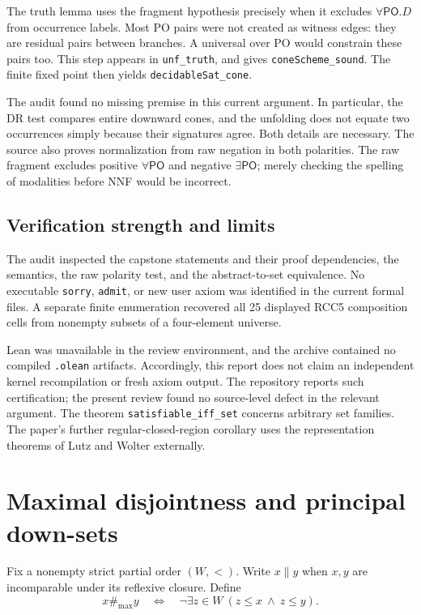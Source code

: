 \documentclass[11pt,letterpaper]{article}
\newcommand{\PO}{\mathsf{PO}}
\newcommand{\code}[1]{\texttt{#1}}
\newcommand{\inc}{\mathrel{\|}}
\theoremstyle{definition}
\theoremstyle{remark}
\begin{document}
The truth lemma uses the fragment hypothesis precisely when it excludes
$\forall\PO.D$ from occurrence labels. Most PO pairs were not created
as witness edges: they are residual pairs between branches. A universal
over PO would constrain these pairs too. This step appears in
\code{unf\_truth}, and gives \code{coneScheme\_sound}. The finite
fixed point then yields \code{decidableSat\_cone}.

The audit found no missing premise in this current argument. In
particular, the DR test compares entire downward cones, and the unfolding
does not equate two occurrences simply because their signatures agree.
Both details are necessary. The source also proves normalization from raw
negation in both polarities. The raw fragment excludes positive
$\forall\PO$ and negative $\exists\PO$; merely checking the spelling
of modalities before NNF would be incorrect.

\subsection{Verification strength and limits}

The audit inspected the capstone statements and their proof dependencies,
the semantics, the raw polarity test, and the abstract-to-set equivalence.
No executable \code{sorry}, \code{admit}, or new user axiom was identified
in the current formal files. A separate finite enumeration recovered all
25 displayed RCC5 composition cells from nonempty subsets of a
four-element universe.

Lean was unavailable in the review environment, and the archive contained
no compiled \code{.olean} artifacts. Accordingly, this report does not
claim an independent kernel recompilation or fresh axiom output. The
repository reports such certification; the present review found no
source-level defect in the relevant argument. The theorem
\code{satisfiable\_iff\_set} concerns arbitrary set families. The
paper's further regular-closed-region corollary uses the representation
theorems of Lutz and Wolter \cite{lutzwolter} externally.

\section{Maximal disjointness and principal down-sets}
\label{sec:downsets}

Fix a nonempty strict partial order $(W,<)$. Write $x\inc y$ when $x,y$
are incomparable under its reflexive closure. Define
\begin{equation}
x\mathrel{\#_{\max}}y
\quad\Longleftrightarrow\quad
\neg\exists z\in W\ (z\leq x\ \land\ z\leq y).
\label{eq:maxdr}
\end{equation}
\end{document}
